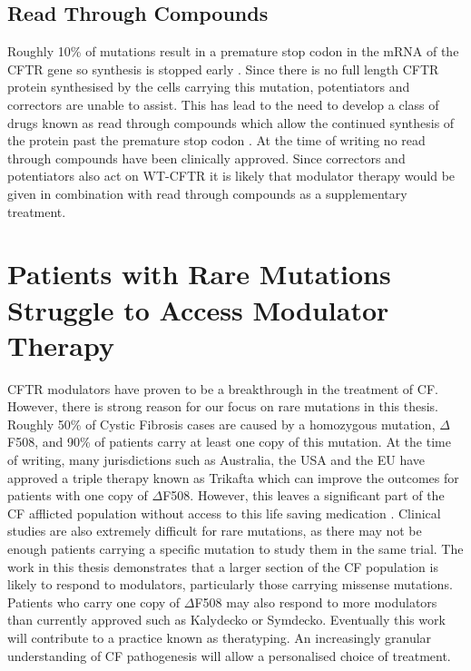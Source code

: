 \subsection{Read Through Compounds}
Roughly 10\% of mutations result in a premature stop codon in the mRNA of the CFTR gene so synthesis is stopped early \cite{}. Since there is no full length CFTR protein synthesised by the cells carrying this mutation, potentiators and correctors are unable to assist. This has lead to the need to develop a class of drugs known as read through compounds which allow the continued synthesis of the protein past the premature stop codon \cite{}. At the  time of writing no read through compounds have been clinically approved. Since correctors and potentiators also act on WT-CFTR it is likely that modulator therapy would be given in combination with read through compounds as a supplementary treatment.

\section{Patients with Rare Mutations Struggle to Access Modulator Therapy}
CFTR modulators have proven to be a breakthrough in the treatment of CF. However, there is strong reason for our focus on rare mutations in this thesis. Roughly 50\% of Cystic Fibrosis cases are caused by a homozygous mutation, $\Delta$F508, and 90\% of patients carry at least one copy of this mutation. At the time of writing, many jurisdictions such as Australia, the USA and the EU have approved a triple therapy known as Trikafta which can improve the outcomes for patients with one copy of $\Delta$F508. However, this leaves a significant part of the CF afflicted population without access to this life saving medication \cite{administration2021, trikafta_website}. Clinical studies are also extremely difficult for rare mutations, as there may not be enough patients carrying a specific mutation to study them in the same trial. The work in this thesis demonstrates that a larger section of the CF population is likely to respond to modulators, particularly those carrying missense mutations. Patients who carry one copy of $\Delta$F508 may also respond to more modulators than currently approved such as Kalydecko or Symdecko. Eventually this work will contribute to a practice known as theratyping. An increasingly granular understanding of CF pathogenesis will allow a personalised choice of treatment.

